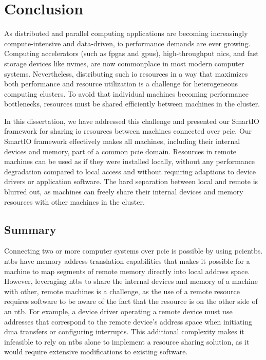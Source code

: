 \chapter{Conclusion}\label{chapter:conclusion}
As distributed and parallel computing applications are becoming increasingly compute-intensive and data-driven, \gls{io} performance demands are ever growing.
%
Computing accelerators (such as \glspl{fpga} and \glspl{gpu}), high-throughput \glspl{nic}, and fast storage devices like \glspl{nvme}, are now commonplace in most modern computer systems.
%
Nevertheless, distributing such \gls{io} resources in a way that maximizes both performance and resource utilization is a challenge for heterogeneous computing clusters. 
%
To avoid that individual machines becoming performance bottlenecks, resources must be shared efficiently between machines in the cluster.



In this dissertation, we have addressed this challenge and presented our SmartIO framework for sharing \gls{io} resources between machines connected over \gls{pcie}.
%
Our SmartIO framework effectively makes all machines, including their internal devices and memory, part of a common \gls{pcie} domain.
%
Resources in remote machines can be used as if they were installed locally, without any performance degradation compared to local access and without requiring adaptions to device drivers or application software.
%
The hard separation between local and remote is blurred out, as machines can freely share their internal devices and memory resources with other machines in the cluster. 



\section{Summary}\label{sec:summary}
Connecting two or more computer systems over \gls{pcie} is possible by using \glspl{pcientb}.
%
\Glspl{ntb} have memory address translation capabilities that makes it possible for a machine to map \glspl{segment} of remote memory directly into local address space.
%
However, leveraging \glspl{ntb} to share the internal devices and memory of a machine with other, remote machines is a challenge, as the use of a remote resource requires software to be aware of the fact that the resource is on the other side of an \gls{ntb}.
%
For example, a device driver operating a remote device must use addresses that correspond to the remote device's address space when initiating \gls{dma} transfers or configuring interrupts.
%
This additional complexity makes it infeasible to rely on \glspl{ntb} alone to implement a resource sharing solution, as it would require extensive modifications to existing software.



